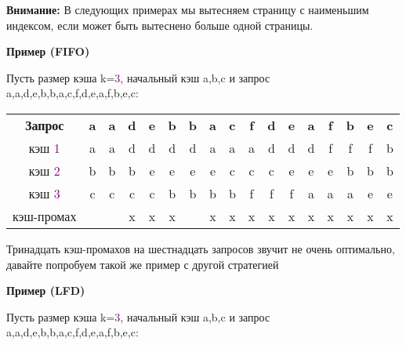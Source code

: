\textbf{Внимание:} В следующих примерах мы вытесняем страницу с наименьшим индексом, если может быть вытеснено больше одной страницы.

\vspace{\baselineskip}

\textbf{Пример (FIFO)}

\vspace{\baselineskip}

Пусть размер кэша k=\textcolor{Purple}{3}, начальный кэш { a,b,c} и запрос 
{ a,a,d,e,b,b,a,c,f,d,e,a,f,b,e,c}:

\vspace{\baselineskip}

\setlength{\tabcolsep}{3pt}
\begin{tabular}{*{17}{c}}
\textbf{Запрос} & \textbf{a} & \textbf{a} & \textbf{d} & \textbf{e} & \textbf{b} & \textbf{b} & \textbf{a} & \textbf{c} & \textbf{f} & \textbf{d} & \textbf{e} & \textbf{a} & \textbf{f} & \textbf{b} & \textbf{e} & \textbf{c}\\
кэш \textcolor{Purple}{1} & a & a & d & d & d & d & a & a & a & d & d & d & f & f & f & b \\
кэш \textcolor{Purple}{2} & b & b & b & e & e & e & e & c & c & c & e & e & e & b & b & b \\
кэш \textcolor{Purple}{3} & c & c & c & c & b & b & b & b & f & f & f & a & a & a & e & e \\
кэш-промах & \ & \ & x & x & x & \ & x & x & x & x & x & x & x & x & x & x \\
\end{tabular}

\vspace{\baselineskip}

Тринадцать кэш-промахов на шестнадцать запросов звучит не очень оптимально, давайте попробуем такой же пример с другой стратегией

\vspace{\baselineskip}

\textbf{Пример (LFD)}

\vspace{\baselineskip}

Пусть размер кэша k=\textcolor{Purple}{3}, начальный кэш { a,b,c} и запрос 
{ a,a,d,e,b,b,a,c,f,d,e,a,f,b,e,c}:

\vspace{\baselineskip}


